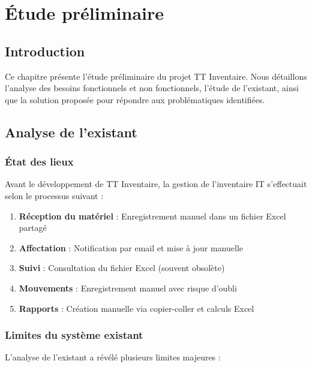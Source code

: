 \documentclass[12pt,a4paper]{report}
\begin{document}
\chapter{Étude préliminaire}

\section{Introduction}

Ce chapitre présente l'étude préliminaire du projet TT Inventaire. Nous détaillons l'analyse des besoins fonctionnels et non fonctionnels, l'étude de l'existant, ainsi que la solution proposée pour répondre aux problématiques identifiées.

\section{Analyse de l'existant}

\subsection{État des lieux}

Avant le développement de TT Inventaire, la gestion de l'inventaire IT s'effectuait selon le processus suivant :

\begin{enumerate}
    \item \textbf{Réception du matériel} : Enregistrement manuel dans un fichier Excel partagé
    \item \textbf{Affectation} : Notification par email et mise à jour manuelle
    \item \textbf{Suivi} : Consultation du fichier Excel (souvent obsolète)
    \item \textbf{Mouvements} : Enregistrement manuel avec risque d'oubli
    \item \textbf{Rapports} : Création manuelle via copier-coller et calculs Excel
\end{enumerate}

\subsection{Limites du système existant}

L'analyse de l'existant a révélé plusieurs limites majeures :
\end{document}
